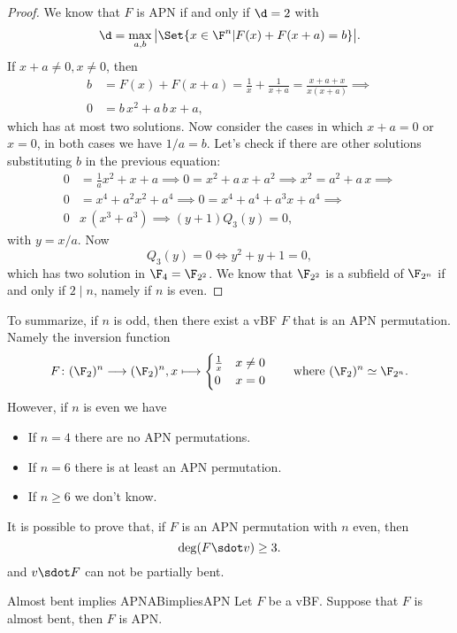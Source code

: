 \begin{proof}
	We know that \(F\) is APN if and only if \(\d=2\) with
	\[
		\d = \max_{a,b}\big\lvert\Set{x \in \F^n | F(x)+F(x+a) = b}\big\rvert.
	\]
	If \(x+a\neq 0, x \neq 0\), then
	\begin{align*}
		b & = F(x) + F(x+a) = \frac{1}{x} + \frac{1}{x+a} = \frac{x+a+x}{x(x+a)} \implies \\
		0 & = b\,x^2+a\,b\,x + a,
	\end{align*}
	which has at most two solutions.
	Now consider the cases in which \(x+a = 0\) or \(x=0\), in both cases we have \(1/a=b\). Let's check if there are other solutions substituting \(b\) in the previous equation:
	\begin{align*}
		0 & =\frac{1}{a}x^2 + x+a \implies 0 = x^2 +a\,x + a^2 \implies x^2 = a^2+a\,x \implies \\
		0 & = x^4+a^2x^2+a^4 \implies 0 = x^4+a^4+a^3 x + a^4 \implies                          \\
		0 & x\,(x^3+a^3) \implies (y+1)Q_3(y) = 0,
	\end{align*}
	with \(y = x/a\). Now
	\[
		Q_3(y) = 0 \iff y^2 + y +1 = 0,
	\]
	which has two solution in \(\F_4=\F_{2^2}\). We know that \(\F_{2^2}\) is a subfield of \(\F_{2^n}\) if and only if \(2\mid n\), namely if \(n\) is even.
\end{proof}

\begin{oss}
	To summarize, if \(n\) is odd, then there exist a vBF \(F\) that is an APN permutation. Namely the inversion function
	\[
		F\colon (\F_2)^n \longrightarrow (\F_2)^n, x \longmapsto
		\begin{cases}
			\frac{1}{x} & x\neq 0 \\
			0           & x = 0
		\end{cases}
		\qquad\text{where }(\F_2)^n \simeq \F_{2^n}.
	\]
	However, if \(n\) is even we have
	\begin{itemize}
		\item If \(n=4\) there are no APN permutations.
		\item If \(n=6\) there is at least an APN permutation.
		\item If \(n\ge 6\) we don't know.
	\end{itemize}
	It is possible to prove that, if \(F\) is an APN permutation with \(n\) even, then
	\[
		\deg(F \sdot v) \ge 3.
	\]
	and \(v\sdot F\) can not be partially bent.
\end{oss}

\begin{teor}{Almost bent implies APN}{ABimpliesAPN}
	Let \(F\) be a vBF. Suppose that \(F\) is almost bent, then \(F\) is APN.
\end{teor}


